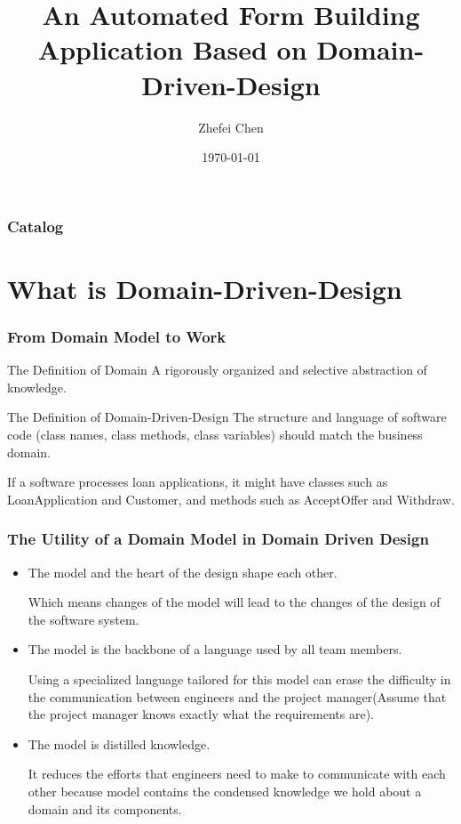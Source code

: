 \documentclass{beamer}
\title[Domain-Driven-Design] %
{An Automated Form Building Application Based on Domain-Driven-Design}
\author[Arthur, Zhefei Chen] %
{Zhefei Chen}
\institute[NJU] %
{
  Department of Computer Science
  of Nanjing University
}
\date[I2EC 2020] %
{\today}
\begin{document}
\frame{\titlepage}


\begin{frame}
\frametitle{Catalog}
\tableofcontents
\end{frame}


\section{What is Domain-Driven-Design}

\begin{frame}
\frametitle{From Domain Model to Work}
\begin{block}{The Definition of Domain}
A rigorously organized and selective abstraction of knowledge.
\end{block}
\begin{alertblock}{The Definition of Domain-Driven-Design}
The structure and language of software code (class names, class methods, class variables) should match the business domain.
\end{alertblock}
\begin{examples}
If a software processes loan applications, it might have classes such as LoanApplication and Customer, and methods such as AcceptOffer and Withdraw.
\end{examples}
\end{frame}
\begin{frame}
\frametitle{The Utility of a Domain Model in Domain Driven Design}
\begin{itemize}
    \item <1-> The model and the heart of the design shape each other.
    
    Which means changes of the model will lead to the changes of the design of the software system.
    
    \item <2-> The model is the backbone of a language used by all team members.
    
    Using a specialized language tailored for this model can erase the difficulty in the communication between engineers and the project manager(Assume that the project manager knows exactly what the requirements are).
    
    \item <3-> The model is distilled knowledge. 
    
    It reduces the efforts that engineers need to make to communicate with each other because model contains the condensed knowledge we hold about a domain and its components.
\end{itemize}
\end{frame}
\end{document}
